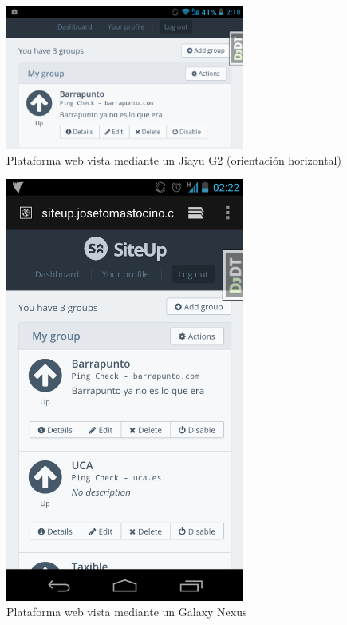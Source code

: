 \begin{figure}[hbtp]
  \centering
  \includegraphics[width=0.7\textwidth]{7_pruebas/captura_jiayu}
  \caption{Plataforma web vista mediante un Jiayu G2 (orientación horizontal)}
  \label{fig:captura_jiayu}
\end{figure}

\begin{figure}[hbtp]
  \centering
  \includegraphics[width=0.7\textwidth]{7_pruebas/captura_galaxy}
  \caption{Plataforma web vista mediante un Galaxy Nexus }
  \label{fig:captura_galaxy}
\end{figure}


